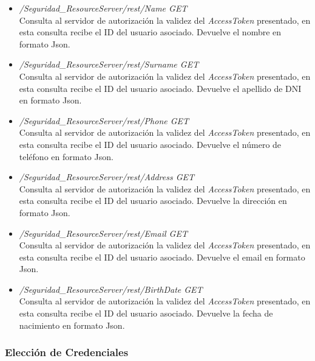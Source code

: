 \documentclass[a4,12pt,onecolum]{article}
\begin{document}
\begin{itemize}
\begin{itemize}
		\item \emph{/Seguridad\_ResourceServer/rest/Name	GET} \\
		Consulta al servidor de autorización la validez del \emph{AccessToken} presentado, en esta consulta 			recibe el ID del usuario asociado. Devuelve el nombre en formato Json.

		\item \emph{/Seguridad\_ResourceServer/rest/Surname	GET} \\
		Consulta al servidor de autorización la validez del \emph{AccessToken} presentado, en esta consulta 			recibe el ID del usuario asociado. Devuelve el apellido de DNI en formato Json.

		\item \emph{/Seguridad\_ResourceServer/rest/Phone	GET} \\
		Consulta al servidor de autorización la validez del \emph{AccessToken} presentado, en esta consulta 			recibe el ID del usuario asociado. Devuelve el número de teléfono en formato Json.

		\item \emph{/Seguridad\_ResourceServer/rest/Address	GET} \\
		Consulta al servidor de autorización la validez del \emph{AccessToken} presentado, en esta consulta 			recibe el ID del usuario asociado. Devuelve la dirección en formato Json.

		\item \emph{/Seguridad\_ResourceServer/rest/Email	GET} \\
		Consulta al servidor de autorización la validez del \emph{AccessToken} presentado, en esta consulta 			recibe el ID del usuario asociado. Devuelve el email en formato Json.

		\item \emph{/Seguridad\_ResourceServer/rest/BirthDate	GET} \\
		Consulta al servidor de autorización la validez del \emph{AccessToken} presentado, en esta consulta 			recibe el ID del usuario asociado. Devuelve la fecha de nacimiento en formato Json.
	\end{itemize}
\end{itemize}



\subsubsection{Elección de Credenciales}
\end{document}
